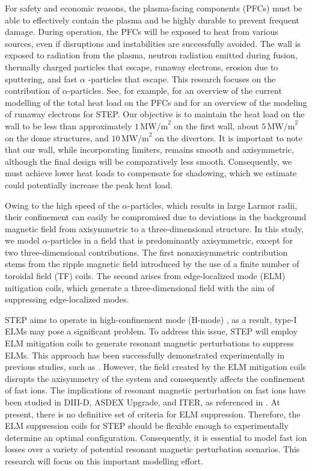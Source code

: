 \documentclass[10pt, a4paper, twoside]{article}
\begin{document}
For safety and economic reasons, the plasma-facing components (PFCs) must be able to effectively contain the plasma and be highly durable to prevent frequent damage. During operation, the PFCs will be exposed to heat from various sources, even if disruptions and instabilities are successfully avoided. The wall is exposed to radiation from the plasma, neutron radiation emitted during fusion, thermally charged particles that escape, runaway electrons, erosion due to sputtering, and fast $\alpha$ -particles that escape. This research focuses on the contribution of $\alpha$-particles. See, for example, \cite{zsolt2023} for an overview of the current modelling of the total heat load on the PFCs and \cite{fil2023} for an overview of the modeling of runaway electrons for STEP. Our objective is to maintain the heat load on the wall to be less than approximately $1\, \text{MW/m}^2$ on the first wall, about $5\, \text{MW/m}^2$ on the dome structures, and $10\, \text{MW/m}^2$ on the divertors. It is important to note that our wall, while incorporating limiters, remains smooth and axisymmetric, although the final design will be comparatively less smooth. Consequently, we must achieve lower heat loads to compensate for shadowing, which we estimate could potentially increase the peak heat load.

Owing to the high speed of the $\alpha$-particles, which results in large Larmor radii, their confinement can easily be compromised due to deviations in the background magnetic field from axisymmetric to a three-dimensional structure.  In this study, we model $\alpha$-particles in a field that is predominantly axisymmetric, except for two three-dimensional contributions. The first nonaxisymmetric contribution stems from the ripple magnetic field introduced by the use of a finite number of toroidal field (TF) coils. The second arises from edge-localized mode (ELM) \cite{zohm1996} mitigation coils, which generate a three-dimensional field with the aim of suppressing edge-localized modes.

STEP aims to operate in high-confinement mode (H-mode) \cite{wagner1982}, as a result, type-I ELMs may pose a significant problem. To address this issue, STEP will employ ELM mitigation coils to generate resonant magnetic perturbations to suppress ELMs. This approach has been successfully demonstrated experimentally in previous studies, such as \cite{suttrop2018}. However, the field created by the ELM mitigation coils disrupts the axisymmetry of the system and consequently affects the confinement of fast ions. The implications of resonant magnetic perturbation on fast ions have been studied in DIII-D, ASDEX Upgrade, and ITER, as referenced in \cite{van2015,sanchis2018,ward2022}. At present, there is no definitive set of criteria for ELM suppression. Therefore, the ELM suppression coils for STEP should be flexible enough to experimentally determine an optimal configuration. Consequently, it is essential to model fast ion losses over a variety of potential resonant magnetic perturbation scenarios. This research will focus on this important modelling effort.
\end{document}
